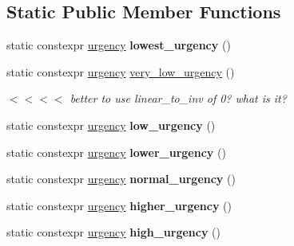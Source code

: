 \subsection*{Static Public Member Functions}
\begin{DoxyCompactItemize}
\item 
\mbox{\label{classfsl_1_1os_1_1urgency_ad03d334f880c826253bed9a89a8ae54d}} 
static constexpr \mbox{\hyperlink{classfsl_1_1os_1_1urgency}{urgency}} {\bfseries lowest\+\_\+urgency} ()
\item 
\mbox{\label{classfsl_1_1os_1_1urgency_a5bacdffd647e24185b75f2acdb3c2d70}} 
static constexpr \mbox{\hyperlink{classfsl_1_1os_1_1urgency}{urgency}} \mbox{\hyperlink{classfsl_1_1os_1_1urgency_a5bacdffd647e24185b75f2acdb3c2d70}{very\+\_\+low\+\_\+urgency}} ()
\begin{DoxyCompactList}\small\item\em $<$$<$$<$$<$ better to use linear\+\_\+to\+\_\+inv of 0? what is it? \end{DoxyCompactList}\item 
\mbox{\label{classfsl_1_1os_1_1urgency_a34a50c87526b44b765b840071ee604e6}} 
static constexpr \mbox{\hyperlink{classfsl_1_1os_1_1urgency}{urgency}} {\bfseries low\+\_\+urgency} ()
\item 
\mbox{\label{classfsl_1_1os_1_1urgency_ac1979503d7647d2cba99990cc77c92a7}} 
static constexpr \mbox{\hyperlink{classfsl_1_1os_1_1urgency}{urgency}} {\bfseries lower\+\_\+urgency} ()
\item 
\mbox{\label{classfsl_1_1os_1_1urgency_a619a02fde622d34baabdca0ba9dd5303}} 
static constexpr \mbox{\hyperlink{classfsl_1_1os_1_1urgency}{urgency}} {\bfseries normal\+\_\+urgency} ()
\item 
\mbox{\label{classfsl_1_1os_1_1urgency_abc95826a29f51df28e61b310b4c77f7e}} 
static constexpr \mbox{\hyperlink{classfsl_1_1os_1_1urgency}{urgency}} {\bfseries higher\+\_\+urgency} ()
\item 
\mbox{\label{classfsl_1_1os_1_1urgency_a0c8a387bcf80cd8edbb7a2cd1f40119d}} 
static constexpr \mbox{\hyperlink{classfsl_1_1os_1_1urgency}{urgency}} {\bfseries high\+\_\+urgency} ()

\end{DoxyCompactItemize}
